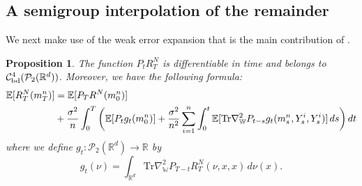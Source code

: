 \documentclass[11pt,reqno]{amsart}
\numberwithin{equation}{section}
\newtheorem{proposition}[theorem]{Proposition}
\theoremstyle{definition}
\def\E{{\mathbb E}}
\def\R{{\mathbb R}}
\def\tr{\mathrm{Tr}}
\newcommand{\wgrad}{\nabla_{\W}}
\newcommand{\W}{\mathbb W}
\begin{document}
\subsection{A semigroup interpolation of the remainder}

We next make use of the weak error expansion that is the main contribution of \cite{Chassagneux2022-jt}. 

\begin{proposition}
\label{pr: PDE on Wasserstein Space}
The function $P_t R^N_T$ is differentiable in time and belongs to $\mathcal C^4_{\textup{bd}}(\mathcal P_2(\R^d))$. Moreover, we have the following formula:
\begin{align}
\begin{split}
\label{eq: P_{T-t} f equation}
    \E[R^N_T(m_T^n)]&=\E[P_T R^N(m_0^n)]\\
    &+\frac{\sigma^2}{n}\int_0^T\bigg(\E[P_{t}g_{t}(m_0^n)]+\frac{\sigma^2}{n^2}\sum_{i=1}^n \int_0^t\E[\tr \wgrad^2  P_{t-s}g_t (m_s^n,Y_s^i,Y_s^i)]\,ds\bigg)\,dt
\end{split}
\end{align}
where we define $g_t : \mathcal P_2(\R^d) \to \R$ by
\begin{equation*}
    g_t(\nu)= \int_{\R^d} \tr\wgrad^2 P_{T-t} R_T^N(\nu,x,x)\,d\nu(x).
\end{equation*}
    \end{proposition}
\end{document}

